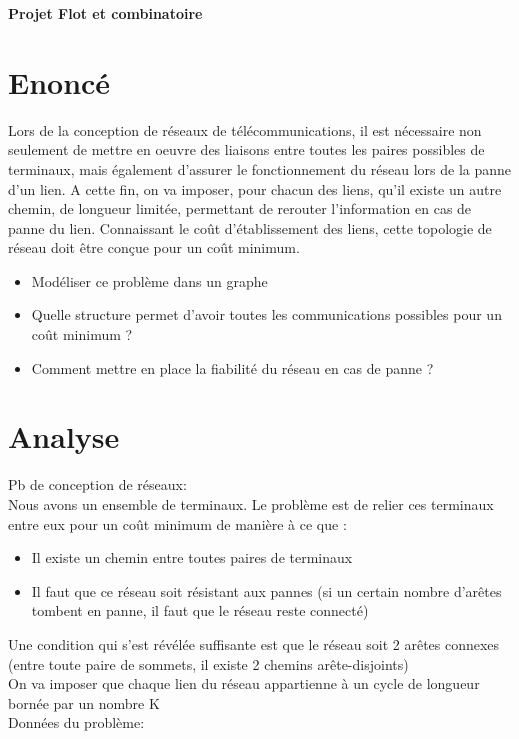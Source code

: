 \documentclass[frenchb]{article}
\begin{document}
		\begin{title}
			\textbf{\huge{Projet Flot et combinatoire}}
		\end{title}
		
		
		\section {Enoncé}
			Lors de la conception de réseaux de télécommunications, il est nécessaire non seulement de mettre en oeuvre des liaisons entre toutes les paires possibles de terminaux, mais également d'assurer le fonctionnement du réseau lors de la panne d'un lien. A cette fin, on va imposer, pour chacun des liens, qu'il existe un autre chemin, de longueur limitée, permettant de rerouter l'information en cas de panne du lien. Connaissant le coût d'établissement des liens, cette topologie de réseau doit être conçue pour un coût minimum.
			\begin{itemize}
				\item{Modéliser ce problème dans un graphe}
				\item{Quelle structure permet d'avoir toutes les communications possibles pour un coût minimum ?}
				\item{Comment mettre en place la fiabilité du réseau en cas de panne ?}
			\end{itemize}
			
			
			\section{Analyse}
				Pb de conception de réseaux:\\
				Nous avons un ensemble de terminaux. Le problème est de relier ces terminaux entre eux pour un coût minimum de manière à ce que :
				\begin{itemize}
					\item{Il existe un chemin entre toutes paires de terminaux}
					\item{Il faut que ce réseau soit résistant aux pannes (si un certain nombre d'arêtes tombent en panne, il faut que le réseau reste connecté)} 
				\end{itemize}
				
				Une condition qui s'est révélée suffisante est que le réseau soit 2 arêtes connexes (entre toute paire de sommets, il existe 2 chemins arête-disjoints)\\
				
				On va imposer que chaque lien du réseau appartienne à un cycle de longueur bornée par un nombre K\\
				Données du problème:\\
				
\end{document}
